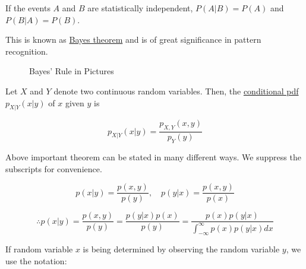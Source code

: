 \documentclass[fleqn]{article}
\begin{document}
	If the events $A$ and $B$ are statistically independent, $P(A|B) = P(A)$ and $P(B|A) = P(B)$.
	
	This is known as \underline{Bayes theorem} and is of great significance in pattern recognition.
	
	\begin{figure}[H]
		\centerline{}
		\caption{Bayes' Rule in Pictures}
		\label{bayes_rule}
	\end{figure}
	
	Let $X$ and $Y$ denote two continuous random variables. Then, the \newline \underline{conditional pdf} $p_{X|Y}(x|y)$ of $x$ given $y$ is
	
	\begin{equation*}
		p_{X|Y}(x|y) = \frac{p_{X,Y}(x,y)}{p_Y(y)}
	\end{equation*}
	
	Above important theorem can be stated in many different ways. We suppress the subscripts for convenience.
	
	\begin{equation*}
		p(x|y) = \frac{p(x,y)}{p(y)},\quad p(y|x) = \frac{p(x,y)}{p(x)}
	\end{equation*}
	
	\begin{equation*}
		\therefore p(x|y) = \frac{p(x,y)}{p(y)} = \frac{p(y|x)p(x)}{p(y)} = \frac{p(x)p(y|x)}{\int_{-\infty}^{\infty}{p(x)p(y|x)dx}}
	\end{equation*}
	
	If random variable $x$ is being determined by observing the random variable $y$, we use the notation:
	
\end{document}
